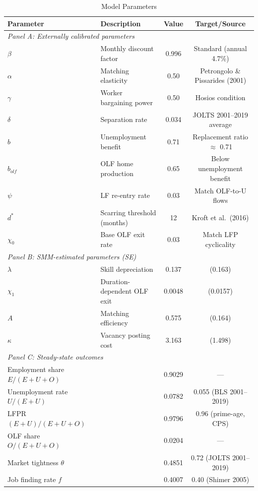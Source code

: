 \begin{table}[H]
\centering
\caption{Model Parameters}
\begin{threeparttable}
\begin{tabular}{llcc}
\toprule
Parameter & Description & Value & Target/Source \\
\midrule
\multicolumn{4}{l}{\textit{Panel A: Externally calibrated parameters}} \\[3pt]
$\beta$ & Monthly discount factor & 0.996 & Standard (annual 4.7\%) \\
$\alpha$ & Matching elasticity & 0.50 & Petrongolo \& Pissarides (2001) \\
$\gamma$ & Worker bargaining power & 0.50 & Hosios condition \\
$\delta$ & Separation rate & 0.034 & JOLTS 2001--2019 average \\
$b$ & Unemployment benefit & 0.71 & Replacement ratio $\approx$ 0.71 \\
$b_{olf}$ & OLF home production & 0.65 & Below unemployment benefit \\
$\psi$ & LF re-entry rate & 0.03 & Match OLF-to-U flows \\
$d^*$ & Scarring threshold (months) & 12 & Kroft et al.\ (2016) \\
$\chi_0$ & Base OLF exit rate & 0.03 & Match LFP cyclicality \\
\midrule
\multicolumn{4}{l}{\textit{Panel B: SMM-estimated parameters (SE)}} \\[3pt]
$\lambda$ & Skill depreciation & 0.137 & (0.163) \\
$\chi_1$ & Duration-dependent OLF exit & 0.0048 & (0.0157) \\
$A$ & Matching efficiency & 0.575 & (0.164) \\
$\kappa$ & Vacancy posting cost & 3.163 & (1.498) \\
\midrule
\multicolumn{4}{l}{\textit{Panel C: Steady-state outcomes}} \\[3pt]
Employment share $E/(E+U+O)$ & & 0.9029 & --- \\
Unemployment rate $U/(E+U)$ & & 0.0782 & 0.055 (BLS 2001--2019) \\
LFPR $(E+U)/(E+U+O)$ & & 0.9796 & 0.96 (prime-age, CPS) \\
OLF share $O/(E+U+O)$ & & 0.0204 & --- \\
Market tightness $\theta$ & & 0.4851 & 0.72 (JOLTS 2001--2019) \\
Job finding rate $f$ & & 0.4007 & 0.40 (Shimer 2005) \\

\end{tabular}
\end{threeparttable}
\end{table}
